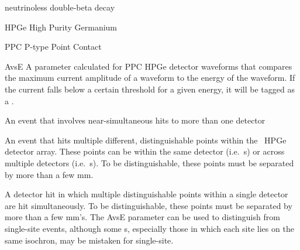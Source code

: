 \begin{glossary}
\item[\znbb] neutrinoless double-beta decay
\item[HPGe] High Purity Germanium
\item[PPC] P-type Point Contact
\item[AvsE] A parameter calculated for PPC HPGe detector waveforms that compares the maximum current amplitude of a waveform to the energy of the waveform. If the current falls below a certain threshold for a given energy, it will be tagged as a \mssd.
\item[\Md] An event that involves near-simultaneous hits to more than one detector
\item[\Msmd] An event that hits multiple different, distinguishable points within the \MJD\ HPGe detector array. These points can be within the same detector (i.e.~\mssd s) or across multiple detectors (i.e.~\md s). To be distinguishable, these points must be separated by more than a few mm.
\item[\Mssd] A detector hit in which multiple distinguishable points within a single detector are hit simultaneously. To be distinguishable, these points must be separated by more than a few mm's. The AvsE parameter can be used to distinguish \mssd from single-site events, although some \mssd s, especially those in which each site lies on the same isochron, may be mistaken for single-site.
 
\end{glossary}
